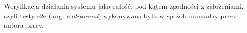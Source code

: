 Weryfikacja działania systemu jako całość, pod kątem zgodności z założeniami, czyli testy e2e (ang. \textit{end-to-end}) wykonywana była w sposób manualny przez autora pracy. 


